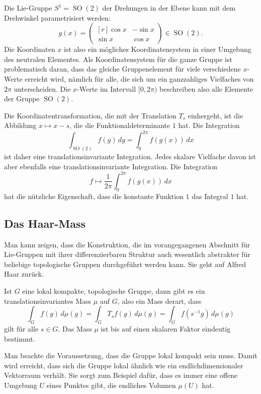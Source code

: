 \begin{beispiel}
Die Lie-Gruppe $S^1 = \operatorname{SO}(2)$ der Drehungen in der Ebene
kann mit dem Drehwinkel parametrisiert werden:
\[
g(x)
=
\begin{pmatrix*}[r]
\cos x&-\sin x\\
\sin x& \cos x
\end{pmatrix*}
\in
\operatorname{SO}(2).
\]
Die Koordinaten $x$ ist also ein mögliches Koordinatensystem in einer
Umgebung des neutralen Elementes.
Als Koordinatensystem für die ganze Gruppe ist problematisch daran,
dass das gleiche Gruppenelement für viele verschiedene $x$-Werte
erreicht wird, nämlich für alle, die sich um ein ganzzahliges
Vielfaches von $2\pi$ unterscheiden.
Die $x$-Werte im Intervall $[0,2\pi)$ beschreiben also alle Elemente
der Gruppe $\operatorname{SO}(2)$. 

Die Koordinatentransformation, die mit der Translation $T_s$ einhergeht,
ist die Abbildung $x\mapsto x-s$, die die Funktionaldeterminante $1$
hat.
Die Integration
\[
\int_{\operatorname{SO}(2)} f(g) \,dg
=
\int_0^{2\pi} f(g(x))\,dx
\]
ist daher eine translationsinvariante Integration.
Jedes skalare Vielfache davon ist aber ebenfalls eine translationsinvariante
Integration.
Die Integration
\[
f
\mapsto
\frac{1}{2\pi}\int_0^{2\pi} f(g(x))\,dx
\]
hat die nützliche Eigenschaft, dass die konstante Funktion $1$ das
Integral $1$ hat.
\end{beispiel}

%
%
\subsection{Das Haar-Mass
\label{buch:haar:subsection:haar}}
Man kann zeigen, dass die Konstruktion, die im vorangegangenen Abschnitt
für Lie-Gruppen mit ihrer differenzierbaren Struktur auch wesentlich
abstrakter für beliebige topologische Gruppen durchgeführt werden kann.
Sie geht auf Alfred Haar zurück.

\begin{satz}[Haar]
\label{buch:gruppen:haar:satz:haar}
Ist $G$ eine lokal kompakte, topologische Gruppe, dann gibt es ein
translationsinvariantes Mass $\mu$ auf $G$, also ein Mass derart,
dass 
\[
\int_G f(g)\,d\mu(g)
=
\int_G T_sf(g)\,d\mu(g)
=
\int_G f(s^{-1}g)\,d\mu(g)
\]
gilt für alle $s\in G$.
Das Mass $\mu$ ist bis auf einen skalaren Faktor eindeutig bestimmt.
\end{satz}

Man beachte die Voraussetzung, dass die Gruppe lokal kompakt sein
muss.
Damit wird erreicht, dass sich die Gruppe lokal ähnlich wie ein
endlichdimensionaler Vektorraum verhält.
Sie sorgt zum Beispiel dafür, dass es immer eine offene Umgebung
$U$ eines Punktes gibt, die endliches Volumen $\mu(U)$ hat.

